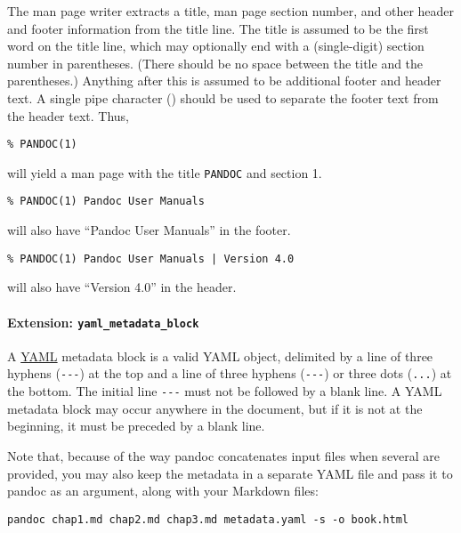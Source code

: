 \documentclass[
]{article}
\begin{document}
The man page writer extracts a title, man page section number, and other
header and footer information from the title line. The title is assumed
to be the first word on the title line, which may optionally end with a
(single-digit) section number in parentheses. (There should be no space
between the title and the parentheses.) Anything after this is assumed
to be additional footer and header text. A single pipe character
(\texttt{\textbar{}}) should be used to separate the footer text from
the header text. Thus,

\begin{verbatim}
% PANDOC(1)
\end{verbatim}

will yield a man page with the title \texttt{PANDOC} and section 1.

\begin{verbatim}
% PANDOC(1) Pandoc User Manuals
\end{verbatim}

will also have ``Pandoc User Manuals'' in the footer.

\begin{verbatim}
% PANDOC(1) Pandoc User Manuals | Version 4.0
\end{verbatim}

will also have ``Version 4.0'' in the header.

\hypertarget{extension-yaml_metadata_block}{%
\paragraph{\texorpdfstring{Extension:
\texttt{yaml\_metadata\_block}}{Extension: yaml\_metadata\_block}}\label{extension-yaml_metadata_block}}

A \href{https://yaml.org/spec/1.2/spec.html}{YAML} metadata block is a
valid YAML object, delimited by a line of three hyphens
(\texttt{-\/-\/-}) at the top and a line of three hyphens
(\texttt{-\/-\/-}) or three dots (\texttt{...}) at the bottom. The
initial line \texttt{-\/-\/-} must not be followed by a blank line. A
YAML metadata block may occur anywhere in the document, but if it is not
at the beginning, it must be preceded by a blank line.

Note that, because of the way pandoc concatenates input files when
several are provided, you may also keep the metadata in a separate YAML
file and pass it to pandoc as an argument, along with your Markdown
files:

\begin{verbatim}
pandoc chap1.md chap2.md chap3.md metadata.yaml -s -o book.html
\end{verbatim}
\end{document}
